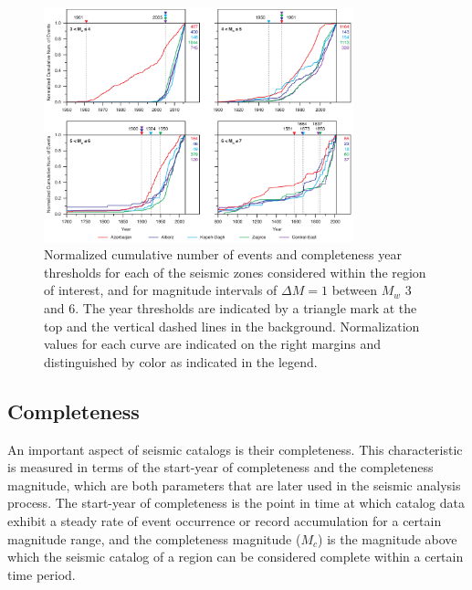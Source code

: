
\begin{figure}[t]
    \centering
    \includegraphics[width=0.8\textwidth]{figures/pdf/figure-05.pdf} 
    \caption{Normalized cumulative number of events and completeness year thresholds for each of the seismic zones considered within the region of interest, and for magnitude intervals of $\Delta M = 1$ between $M_w$ 3 and 6. The year thresholds are indicated by a triangle mark at the top and the vertical dashed lines in the background. Normalization values for each curve are indicated on the right margins and distinguished by color as indicated in the legend.}
    \label{fig:completeness}
\end{figure}

\subsection{Completeness}

An important aspect of seismic catalogs is their completeness. This characteristic is measured in terms of the start-year of completeness and the completeness magnitude, which are both parameters that are later used in the seismic analysis process. The start-year of completeness is the point in time at which catalog data exhibit a steady rate of event occurrence or record accumulation for a certain magnitude range, and the completeness magnitude ($M_c$) is the magnitude above which the seismic catalog of a region can be considered complete within a certain time period.

